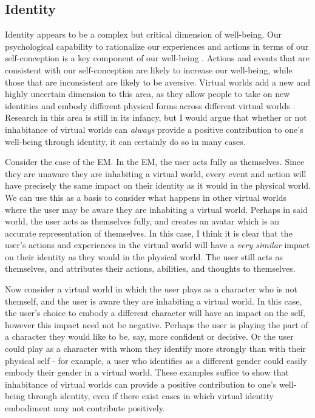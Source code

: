 \subsection{Identity}
Identity appears to be a complex but critical dimension of well-being. Our
psychological capability to rationalize our experiences and actions in terms of
our self-conception is a key component of our well-being \citep{McAdams2013}.
Actions and events that are consistent with our self-conception are likely to
increase our well-being, while those that are inconsistent are likely to be
aversive. Virtual worlds add a new and highly uncertain dimension to this area,
as they allow people to take on new identities and embody different physical 
forms across different virtual worlds \citep{Lin2022}. Research in this area is
still in its infancy, but I would argue that whether or not inhabitance of
virtual worlds can \emph{always} provide a positive contribution to one's
well-being through identity, it can certainly do so in many cases.

Consider the case of the EM. In the EM, the user acts fully as themselves. Since
they are unaware they are inhabiting a virtual world, every event and action
will have precisely the same impact on their identity as it would in the
physical world. We can use this as a basis to consider what happens in other 
virtual worlds where the user may be aware they are inhabiting a virtual world. 
Perhaps in said world, the user acts as themselves fully, and creates an avatar
which is an accurate representation of themselves. In this case, I think it is
clear that the user's actions and experiences in the virtual world will have a 
\emph{very similar} impact on their identity as they would in the physical
world. The user still acts as themselves, and attributes their actions,
abilities, and thoughts to themselves.

Now consider a virtual world in which the user plays as a character who is not
themself, and the user is aware they are inhabiting a virtual world. In this
case, the user's choice to embody a different character will have an impact on
the self, however this impact need not be negative. Perhaps the user is playing
the part of a character they would like to be, say, more confident or decisive.
Or the user could play as a character with whom they identify more strongly than
with their physical self - for example, a user who identifies as a different
gender could easily embody their gender in a virtual world. These examples
suffice to show that inhabitance of virtual worlds can provide a positive
contribution to one's well-being through identity, even if there exist cases in
which virtual identity embodiment may not contribute positively.
